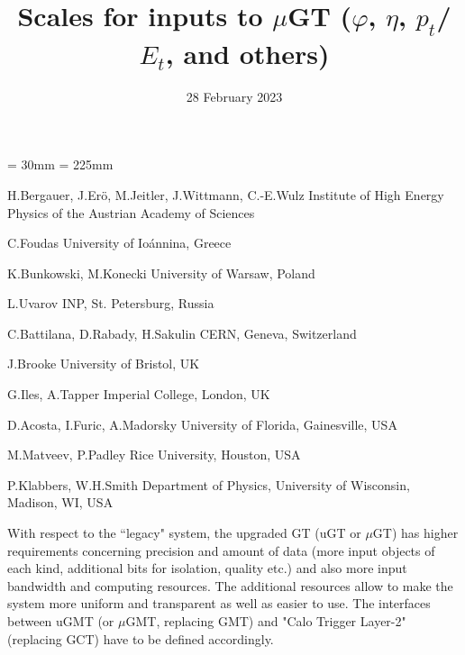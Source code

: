 \documentclass{cmspaper}
\begin{document}
\topmargin = 30mm
\textheight = 225mm

\def\detectornote#1{{Available on CMS information server
\hfill\Large\bf CMS DN #1}
\begin{center}\texttt{[image: cms\_dn.eps]}\end{center}}

\begin{titlepage}

\date{28 February 2023}
\title{Scales for inputs to $\mu$GT
($\varphi$, $\eta$, $p_t$/$E_t$, and others)}

\begin{Authlist}
{H.Bergauer, J.Er\"{o}, M.Jeitler,
J.Wittmann, C.-E.Wulz}
{Institute of High Energy Physics of the Austrian Academy of Sciences}

C.Foudas
{University of Io\'annina, Greece}

K.Bunkowski, M.Konecki
{University of Warsaw, Poland}

L.Uvarov
{INP, St. Petersburg, Russia}

C.Battilana, D.Rabady, H.Sakulin
{CERN, Geneva, Switzerland}

J.Brooke
{University of Bristol, UK}

G.Iles, A.Tapper
{Imperial College, London, UK}


D.Acosta, I.Furic, A.Madorsky
{University of Florida, Gainesville, USA}

M.Matveev, P.Padley
{Rice University, Houston, USA}

P.Klabbers, W.H.Smith
{Department of Physics, University of Wisconsin, Madison, WI, USA }

\end{Authlist}

\end{titlepage}

With respect to the ``legacy" system, the upgraded GT (uGT or $\mu$GT) has higher requirements concerning precision and amount of data (more input objects of each kind, additional bits for isolation, quality etc.) and also more input bandwidth and computing resources. The additional resources  allow to make the system more uniform and transparent as well as easier to use. The interfaces between uGMT (or $\mu$GMT, replacing GMT) and "Calo Trigger Layer-2" (replacing GCT) have to be defined accordingly.
\end{document}
